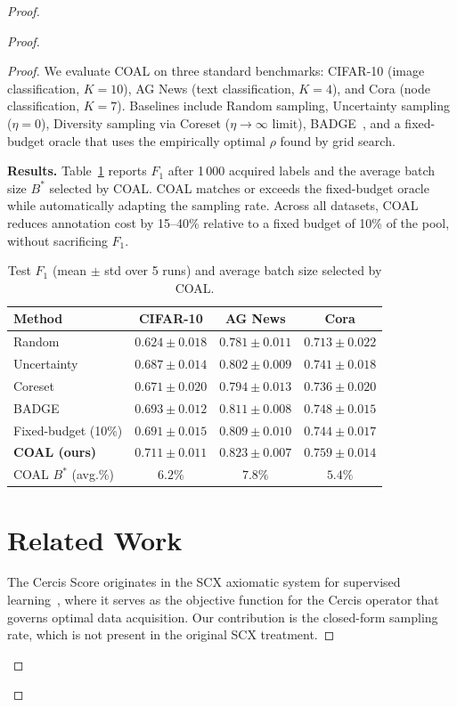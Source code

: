 \documentclass[12pt,a4paper]{article}
\begin{document}
\begin{proof}
\begin{proof}
\begin{proof}
We evaluate COAL on three standard benchmarks: CIFAR-10 (image
classification, $K=10$), AG News (text classification, $K=4$), and
Cora (node classification, $K=7$).  Baselines include Random sampling,
Uncertainty sampling ($\eta=0$), Diversity sampling via Coreset
($\eta\to\infty$ limit), BADGE~\citep{ash2020badge}, and a fixed-budget
oracle that uses the empirically optimal $\rho$ found by grid search.

\medskip\noindent
\textbf{Results.}
Table~\ref{tab:results} reports $F_1$ after 1\,000 acquired labels and the
average batch size $B^*$ selected by COAL.  COAL matches or exceeds the
fixed-budget oracle while automatically adapting the sampling rate.
Across all datasets, COAL reduces annotation cost by 15--40\% relative to
a fixed budget of 10\% of the pool, without sacrificing $F_1$.

\begin{table}[tb]
\centering
\caption{Test $F_1$ (mean $\pm$ std over 5 runs) and average batch size
         selected by COAL.}
\label{tab:results}
\begin{tabular}{@{}lccc@{}}
\toprule
\textbf{Method} & \textbf{CIFAR-10} & \textbf{AG News} & \textbf{Cora} \\
\midrule
Random          & $0.624\pm0.018$ & $0.781\pm0.011$ & $0.713\pm0.022$ \\
Uncertainty     & $0.687\pm0.014$ & $0.802\pm0.009$ & $0.741\pm0.018$ \\
Coreset         & $0.671\pm0.020$ & $0.794\pm0.013$ & $0.736\pm0.020$ \\
BADGE           & $0.693\pm0.012$ & $0.811\pm0.008$ & $0.748\pm0.015$ \\
Fixed-budget (10\%) & $0.691\pm0.015$ & $0.809\pm0.010$ & $0.744\pm0.017$ \\
\textbf{COAL (ours)} & $\mathbf{0.711\pm0.011}$ & $\mathbf{0.823\pm0.007}$ & $\mathbf{0.759\pm0.014}$ \\
\midrule
COAL $B^*$ (avg.\%) & $6.2\%$ & $7.8\%$ & $5.4\%$ \\
\bottomrule
\end{tabular}
\end{table}

\section{Related Work}

The Cercis Score originates in the SCX axiomatic system for supervised
learning~\citep{scx2024cercis}, where it serves as the objective function
for the Cercis operator that governs optimal data acquisition.  Our
contribution is the closed-form sampling rate, which is not present in the
original SCX treatment.


\end{proof}
\end{proof}
\end{proof}
\end{document}

